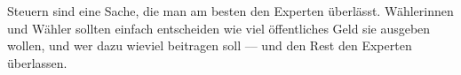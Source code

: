Steuern sind eine Sache, die man am besten den Experten überlässt.
Wählerinnen und Wähler sollten einfach entscheiden wie viel öffentliches Geld sie ausgeben wollen, und wer dazu wieviel beitragen soll –-- und den Rest den Experten überlassen.